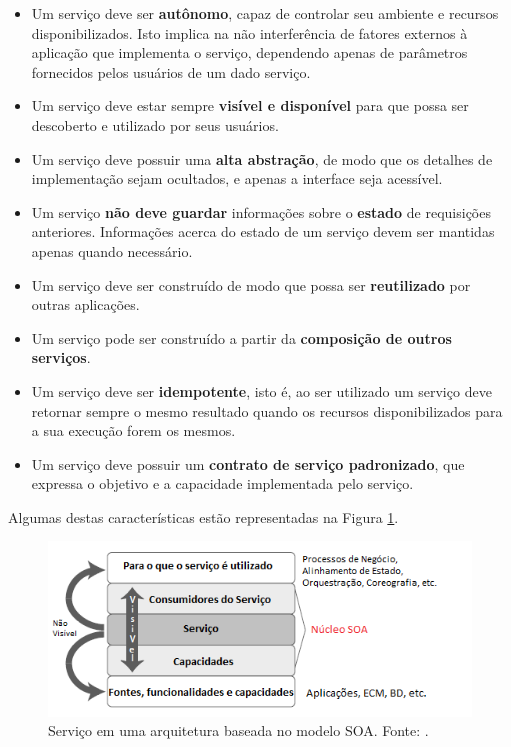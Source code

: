 \begin{itemize}
\item Um serviço deve ser \textbf{autônomo},  capaz de controlar seu ambiente e recursos disponibilizados. Isto implica na não interferência de fatores externos à aplicação que implementa o serviço, dependendo apenas de parâmetros fornecidos pelos usuários de um dado serviço.

\item Um serviço deve estar sempre \textbf{visível e disponível} para que possa ser descoberto e utilizado por seus usuários.

\item Um serviço deve possuir uma \textbf{alta abstração}, de modo que os detalhes de implementação sejam ocultados, e apenas a interface seja acessível.

\item Um serviço \textbf{não deve guardar} informações sobre o \textbf{estado} de requisições anteriores. Informações acerca do estado de um serviço devem ser mantidas apenas quando necessário.

\item Um serviço deve ser construído de modo que possa ser \textbf{reutilizado} por outras aplicações.

\item Um serviço pode ser construído a partir da \textbf{composição de outros serviços}.

\item Um serviço deve ser \textbf{idempotente}, isto é, ao ser utilizado um serviço deve retornar sempre o mesmo resultado quando os recursos disponibilizados para a sua execução forem os mesmos.

\item Um serviço deve possuir um \textbf{contrato de serviço padronizado}, que expressa o objetivo e a capacidade implementada pelo serviço.
\end{itemize}

Algumas destas características estão representadas na Figura \ref{servico_na_arquitetura}.

\begin{figure}[htb]
\centering
\includegraphics[scale=0.8]{figuras/servico_na_arquitetura.png}
\caption{Serviço em uma arquitetura baseada no modelo SOA. Fonte: \cite{nickull_service_2007}.}
\label{servico_na_arquitetura}
\end{figure}


